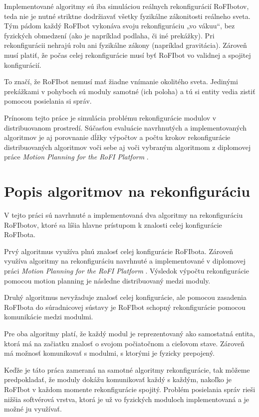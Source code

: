 \documentclass[
  digital, %
  oneside, %
  table,   %
  lof,     %
  nolot,     %
]{fithesis3}
\begin{document}
Implementované algoritmy sú iba simuláciou reálnych rekonfigurácií RoFIbotov, teda nie je nutné striktne dodržiavať všetky fyzikálne zákonitosti reálneho sveta. Tým pádom každý RoFIbot vykonáva svoju rekonfiguráciu „vo vákuu“, bez fyzických obmedzení (ako je napríklad podlaha, či iné prekážky). Pri rekonfigurácii nehrajú rolu ani fyzikálne zákony (napríklad gravitácia). Zároveň musí platiť, že počas celej rekonfigurácie musí byť RoFIbot vo validnej a spojitej konfigurácií. 

To značí, že RoFIbot nemusí mať žiadne vnímanie okolitého sveta. Jedinými prekážkami v pohyboch sú moduly samotné (ich poloha) a tú si entity vedia zistiť pomocou posielania si správ. 

Prínosom tejto práce je simulácia problému rekonfigurácie modulov v distribuovanom prostredí. Súčasťou evaluácie navrhnutých a implementovaných algoritmov je aj porovnanie dĺžky výpočtov a počtu krokov rekonfigurácie distribuovaných algoritmov voči sebe aj voči vybraným algoritmom z diplomovej práce \textit{Motion Planning for the RoFI Platform} \cite{vozarovaMasterThesis}. 

\section{Popis algoritmov na rekonfiguráciu}
\label{sec:algoDesc}
V tejto práci sú navrhnuté a implementovaná dva algoritmy na rekonfiguráciu RoFIbotov, ktoré sa líšia hlavne prístupom k znalosti celej konfigurácie RoFIbota. 

Prvý algoritmus využíva plnú znalosť celej konfigurácie RoFIbota. Zároveň využíva algoritmy na rekonfiguráciu navrhnuté a implementované v diplomovej práci \textit{Motion Planning for the RoFI Platform} \cite{vozarovaMasterThesis}. Výsledok výpočtu rekonfigurácie pomocou motion planning je následne distribuovaný medzi moduly. 

Druhý algoritmus nevyžaduje znalosť celej konfigurácie, ale pomocou zasadenia RoFIbota do súradnicovej sústavy je RoFIbot schopný rekonfigurácie pomocou komunikácie medzi modulmi. 

Pre oba algoritmy platí, že každý modul je reprezentovaný ako samostatná entita, ktorá má na začiatku znalosť o svojom počiatočnom a cieľovom stave. Zároveň má možnosť komunikovať s modulmi, s ktorými je fyzicky prepojený. 

Keďže je táto práca zameraná na samotné algoritmy rekonfigurácie, tak môžeme predpokladať, že moduly dokážu komunikovať každý s každým, nakoľko je RoFIbot v každom momente rekonfigurácie spojitý. Problém posielania správ rieši nižšia softvérová vrstva, ktorá je už vo fyzických moduloch implementovaná a je možné ju využívať. 
\end{document}
